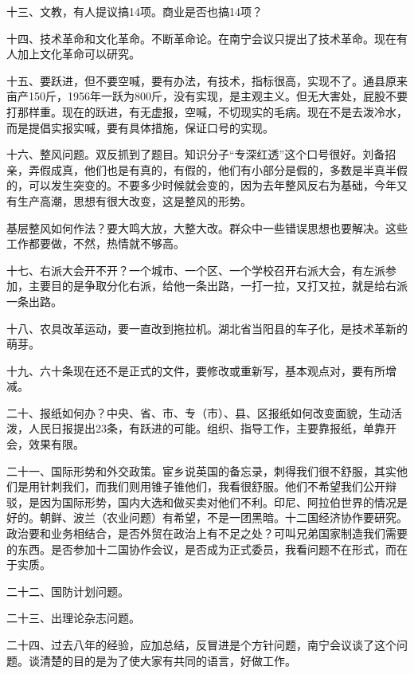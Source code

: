 十三、文教，有人提议搞14项。商业是否也搞14项？

十四、技术革命和文化革命。不断革命论。在南宁会议只提出了技术革命。现在有人加上文化革命可以研究。

十五、要跃进，但不要空喊，要有办法，有技术，指标很高，实现不了。通县原来亩产150斤，1956年一跃为800斤，没有实现，是主观主义。但无大害处，屁股不要打那样重。现在的跃进，有无虚报，空喊，不切现实的毛病。现在不是去泼冷水，而是提倡实报实喊，要有具体措施，保证口号的实现。

十六、整风问题。双反抓到了题目。知识分子“专深红透”这个口号很好。刘备招亲，弄假成真，他们也是有真的，有假的，他们有小部分是假的，多数是半真半假的，可以发生突变的。不要多少时候就会变的，因为去年整风反右为基础，今年又有生产高潮，思想有很大改变，这是整风的形势。

基层整风如何作法？要大鸣大放，大整大改。群众中一些错误思想也要解决。这些工作都要做，不然，热情就不够高。

十七、右派大会开不开？一个城市、一个区、一个学校召开右派大会，有左派参加，主要目的是争取分化右派，给他一条出路，一打一拉，又打又拉，就是给右派一条出路。

十八、农具改革运动，要一直改到拖拉机。湖北省当阳县的车子化，是技术革新的萌芽。

十九、六十条现在还不是正式的文件，要修改或重新写，基本观点对，要有所增减。

二十、报纸如何办？中央、省、市、专（市）、县、区报纸如何改变面貌，生动活泼，人民日报提出23条，有跃进的可能。组织、指导工作，主要靠报纸，单靠开会，效果有限。

二十一、国际形势和外交政策。宦乡说英国的备忘录，刺得我们很不舒服，其实他们是用针刺我们，而我们则用锥子锥他们，我看很舒服。他们不希望我们公开辩驳，是因为国际形势，国内大选和做买卖对他们不利。印尼、阿拉伯世界的情况是好的。朝鲜、波兰（农业问题）有希望，不是一团黑暗。十二国经济协作要研究。政治要和业务相结合，是否外贸在政治上有不足之处？可叫兄弟国家制造我们需要的东西。是否参加十二国协作会议，是否成为正式委员，我看问题不在形式，而在于实质。

二十二、国防计划问题。

二十三、出理论杂志问题。

二十四、过去八年的经验，应加总结，反冒进是个方针问题，南宁会议谈了这个问题。谈清楚的目的是为了使大家有共同的语言，好做工作。

